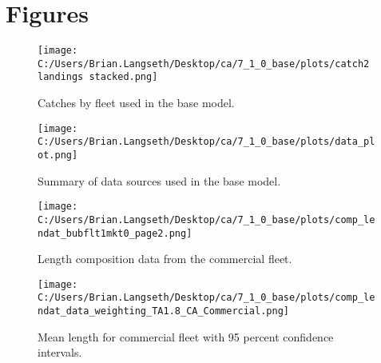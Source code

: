 \documentclass[11pt,
  english,
  a4paper,
]{article}
\begin{document}
\clearpage


\hypertarget{figures}{%
\section{Figures}\label{figures}}

\leavevmode\tagmcend\tagstructend


\begin{figure}
\centering
\texttt{[image: C:/Users/Brian.Langseth/Desktop/ca/7\_1\_0\_base/plots/catch2 landings stacked.png]}
\caption{Catches by fleet used in the base model.\label{fig:catch}}
\end{figure}

\tagmcend\tagstructend


\begin{figure}
\centering
\texttt{[image: C:/Users/Brian.Langseth/Desktop/ca/7\_1\_0\_base/plots/data\_plot.png]}
\caption{Summary of data sources used in the base model.\label{fig:data-plot}}
\end{figure}

\tagmcend\tagstructend


\begin{figure}
\centering
\texttt{[image: C:/Users/Brian.Langseth/Desktop/ca/7\_1\_0\_base/plots/comp\_lendat\_bubflt1mkt0\_page2.png]}
\caption{Length composition data from the commercial fleet.\label{fig:com-len-data}}
\end{figure}

\tagmcend\tagstructend


\begin{figure}
\centering
\texttt{[image: C:/Users/Brian.Langseth/Desktop/ca/7\_1\_0\_base/plots/comp\_lendat\_data\_weighting\_TA1.8\_CA\_Commercial.png]}
\caption{Mean length for commercial fleet with 95 percent confidence intervals.\label{fig:mean-com-len-data}}
\end{figure}
\end{document}
